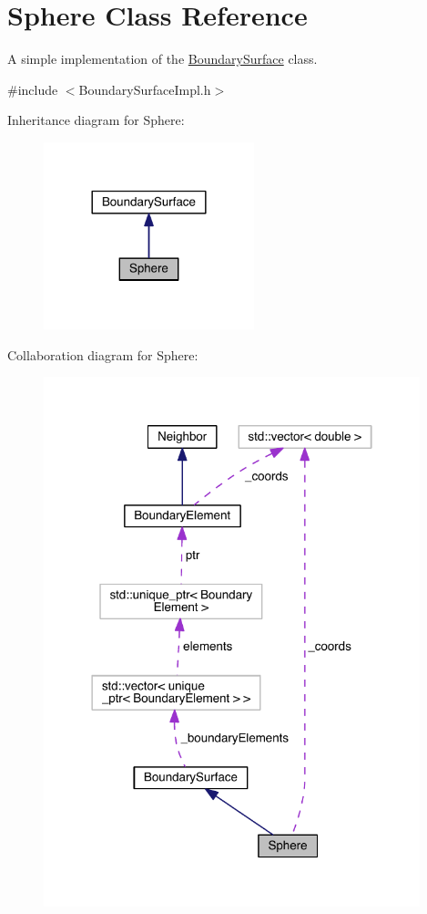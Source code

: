 \hypertarget{classSphere}{\section{Sphere Class Reference}
\label{classSphere}
}


A simple implementation of the \hyperlink{classBoundarySurface}{Boundary\+Surface} class.  




{\ttfamily \#include $<$Boundary\+Surface\+Impl.\+h$>$}



Inheritance diagram for Sphere\+:\nopagebreak
\begin{figure}[H]
\begin{center}
\leavevmode
\includegraphics[width=173pt]{classSphere__inherit__graph}
\end{center}
\end{figure}


Collaboration diagram for Sphere\+:
\nopagebreak
\begin{figure}[H]
\begin{center}
\leavevmode
\includegraphics[width=310pt]{classSphere__coll__graph}
\end{center}
\end{figure}
